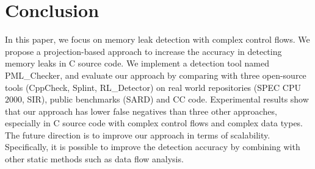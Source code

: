 \section{Conclusion}\label{sec:conclusion}

In this paper, we focus on memory leak detection with complex control flows. We propose a projection-based approach to increase the accuracy in detecting memory leaks in C source code. We implement a detection tool named PML\_Checker, and evaluate our approach by comparing with three open-source tools (CppCheck, Splint, RL\_Detector) on real world repositories (SPEC CPU $2000$, SIR), public benchmarks (SARD) and CC code. Experimental results show that our approach has lower false negatives than three other approaches, especially in C source code with complex control flows and complex data types. The future direction is to improve our approach in terms of scalability. Specifically, it is possible to improve the detection accuracy by combining with other static methods such as data flow analysis.
